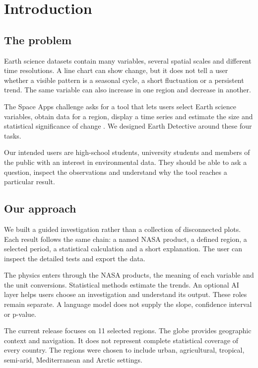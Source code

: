 \documentclass[10pt,a4paper,twocolumn]{article}
\begin{document}
\section{Introduction}
\subsection{The problem}
Earth science datasets contain many variables, several spatial scales and different time resolutions. A line chart can show change, but it does not tell a user whether a visible pattern is a seasonal cycle, a short fluctuation or a persistent trend. The same variable can also increase in one region and decrease in another.

The Space Apps challenge asks for a tool that lets users select Earth science variables, obtain data for a region, display a time series and estimate the size and statistical significance of change \cite{challenge}. We designed Earth Detective around these four tasks.

Our intended users are high-school students, university students and members of the public with an interest in environmental data. They should be able to ask a question, inspect the observations and understand why the tool reaches a particular result.

\subsection{Our approach}
We built a guided investigation rather than a collection of disconnected plots. Each result follows the same chain: a named NASA product, a defined region, a selected period, a statistical calculation and a short explanation. The user can inspect the detailed tests and export the data.

The physics enters through the NASA products, the meaning of each variable and the unit conversions. Statistical methods estimate the trends. An optional AI layer helps users choose an investigation and understand its output. These roles remain separate. A language model does not supply the slope, confidence interval or p-value.

The current release focuses on 11 selected regions. The globe provides geographic context and navigation. It does not represent complete statistical coverage of every country. The regions were chosen to include urban, agricultural, tropical, semi-arid, Mediterranean and Arctic settings.
\end{document}
